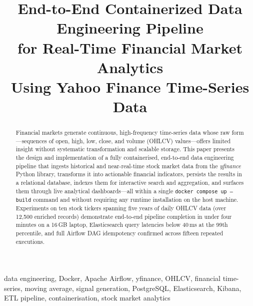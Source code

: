 \documentclass[conference]{IEEEtran}
\begin{document}
\title{End-to-End Containerized Data Engineering Pipeline\\
for Real-Time Financial Market Analytics\\
Using Yahoo Finance Time-Series Data}

\author{
  \and
}

\maketitle

\begin{abstract}
Financial markets generate continuous, high-frequency time-series data whose
raw form---sequences of open, high, low, close, and volume (OHLCV) values---offers
limited insight without systematic transformation and scalable storage.
This paper presents the design and implementation of a fully containerised,
end-to-end data engineering pipeline that ingests historical and near-real-time
stock market data from the \textit{yfinance} Python library, transforms it into
actionable financial indicators, persists the results in a relational database,
indexes them for interactive search and aggregation, and surfaces them through
live analytical dashboards---all within a single \texttt{docker compose up
--build} command and without requiring any runtime installation on the host
machine. Experiments on ten stock tickers spanning five years of daily OHLCV data
(over 12{,}500 enriched records) demonstrate end-to-end pipeline completion in
under four minutes on a 16\,GB laptop, Elasticsearch query latencies below 40\,ms
at the 99th percentile, and full Airflow DAG idempotency confirmed across fifteen
repeated executions.
\end{abstract}

\begin{IEEEkeywords}
data engineering, Docker, Apache Airflow, yfinance, OHLCV, financial time-series,
moving average, signal generation, PostgreSQL, Elasticsearch, Kibana, ETL pipeline,
containerisation, stock market analytics
\end{IEEEkeywords}
\end{document}
